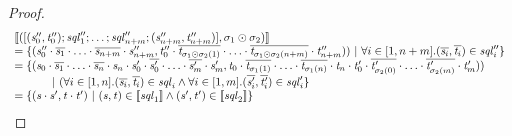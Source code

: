 \documentclass[numbers]{sigplanconf}
\begin{document}
\begin{proof}
  \[
    \begin{array}{l}
      [ \! [([(\mathit{s}_0'',\mathit{t}_0'');\mathit{sql}_1'';
      \ldots;
      \mathit{sql}_{n+m}'';(\mathit{s}_{n+m}'',\mathit{t}_{n+m}'')],
      \sigma_1\odot\sigma_2)] \! ]\\
      = \{(\mathit{s}_0''\cdot\overline{\mathit{s}_1}\cdot
      \ldots\cdot\overline{\mathit{s}_{n+m}}\cdot\mathit{s}_{n+m}'',
      \mathit{t}_0''\cdot\overline{\mathit{t}_{\sigma_1\odot\sigma_2(1)}}\cdot
      \ldots\cdot\overline{\mathit{t}_{\sigma_1\odot\sigma_2(n+m)}}\cdot\mathit{t}_{n+m}''))~|~
      \forall i\in[1,n+m].(\overline{\mathit{s}_i},\overline{\mathit{t}_i})\in\mathit{sql}_i''\}\\
      = \{(\mathit{s}_0\cdot\overline{\mathit{s}_1}\cdot\ldots\cdot
      \overline{\mathit{s}_n}\cdot\mathit{s}_n\cdot\mathit{s}_0'\cdot\overline{\mathit{s}_{0}'}\cdot
      \ldots\cdot\overline{\mathit{s}_m'}\cdot\mathit{s}_m',
      \mathit{t}_0\cdot\overline{\mathit{t}_{\sigma_1(1)}}\cdot\ldots\cdot
      \overline{\mathit{t}_{\sigma_1(n)}}\cdot\mathit{t}_n\cdot\mathit{t}_0'
      \cdot\overline{\mathit{t}_{\sigma_2(0)}'}\cdot
      \ldots\cdot\overline{\mathit{t}_{\sigma_2(m)}'}\cdot\mathit{t}_m'))\\
      \hspace*{3em}~|~
      (\forall i\in[1,n].
      (\overline{\mathit{s}_i},\overline{\mathit{t}_i})\in\mathit{sql}_i
      \wedge
      \forall i\in[1,m].
      (\overline{\mathit{s}_i'},\overline{\mathit{t}_i'})\in\mathit{sql}_i'\}\\
      = \{(\mathit{s}\cdot\mathit{s}',\mathit{t}\cdot\mathit{t}')~|~
      (\mathit{s},\mathit{t})\in[ \! [\mathit{sql}_1] \! ]
      \wedge
      (\mathit{s}',\mathit{t}')\in[ \! [\mathit{sql}_2] \! ]\}
    \end{array}
  \]

\end{proof}
\end{document}
